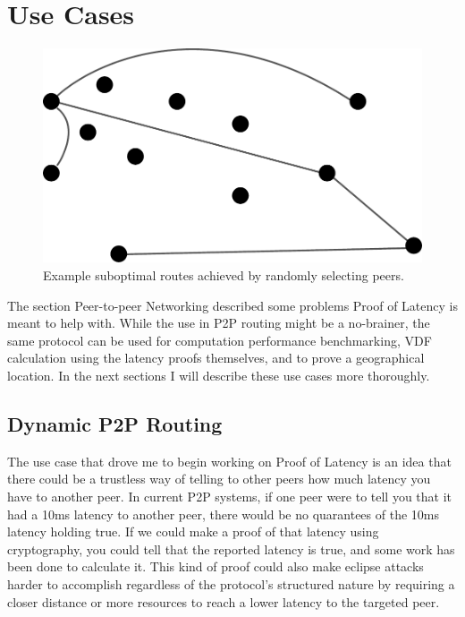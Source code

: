 \section{Use Cases}
\begin{figure}
	\includegraphics[width=\textwidth]{pictures/random_routing.pdf}
	\caption{Example suboptimal routes achieved by randomly selecting peers.}
	\label{Subobtimal Topology}
\end{figure}
The section Peer-to-peer Networking described some problems Proof of Latency is meant to help with. While the use in P2P routing might be a no-brainer, the same protocol can be used for computation performance benchmarking, VDF calculation using the latency proofs themselves, and to prove a geographical location. In the next sections I will describe these use cases more thoroughly.

\subsection{Dynamic P2P Routing}
The use case that drove me to begin working on Proof of Latency is an idea that there could be a trustless way of telling to other peers how much latency you have to another peer. In current P2P systems, if one peer were to tell you that it had a 10ms latency to another peer, there would be no quarantees of the 10ms latency holding true. If we could make a proof of that latency using cryptography, you could tell that the reported latency is true, and some work has been done to calculate it. This kind of proof could also make eclipse attacks harder to accomplish regardless of the protocol's structured nature by requiring a closer distance or more resources to reach a lower latency to the targeted peer.


